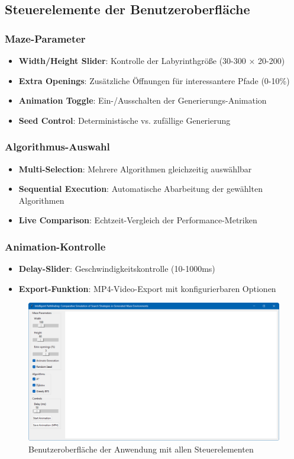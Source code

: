 \documentclass[12pt,a4paper]{article}
\begin{document}
\subsection{Steuerelemente der Benutzeroberfläche}

\subsubsection{Maze-Parameter}
\begin{itemize}
    \item \textbf{Width/Height Slider}: Kontrolle der Labyrinthgröße (30-300 × 20-200)
    \item \textbf{Extra Openings}: Zusätzliche Öffnungen für interessantere Pfade (0-10\%)
    \item \textbf{Animation Toggle}: Ein-/Ausschalten der Generierungs-Animation
    \item \textbf{Seed Control}: Deterministische vs. zufällige Generierung
\end{itemize}

\subsubsection{Algorithmus-Auswahl}
\begin{itemize}
    \item \textbf{Multi-Selection}: Mehrere Algorithmen gleichzeitig auswählbar
    \item \textbf{Sequential Execution}: Automatische Abarbeitung der gewählten Algorithmen
    \item \textbf{Live Comparison}: Echtzeit-Vergleich der Performance-Metriken
\end{itemize}

\subsubsection{Animation-Kontrolle}
\begin{itemize}
    \item \textbf{Delay-Slider}: Geschwindigkeitskontrolle (10-1000ms)
    \item \textbf{Export-Funktion}: MP4-Video-Export mit konfigurierbaren Optionen
\end{itemize}

\begin{figure}[H]
\centering
\includegraphics[width=\textwidth]{gui.png}
\caption{Benutzeroberfläche der Anwendung mit allen Steuerelementen}
\label{fig:gui}
\end{figure}
\end{document}
